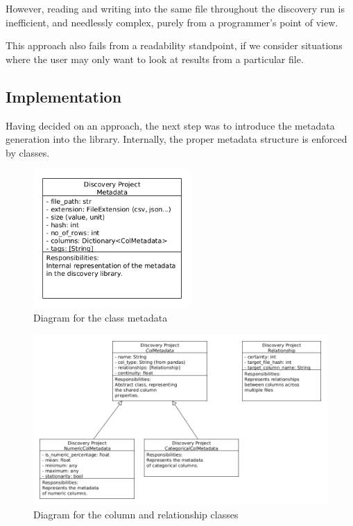However, reading and writing into the same file throughout the discovery run is inefficient, and
needlessly complex, purely from a programmer's point of view.

This approach also fails from a readability standpoint, if we consider situations where the user
may only want to look at results from a particular file.

\subsection{Implementation}

Having decided on an approach, the next step was to introduce the metadata generation into the library.
Internally, the proper metadata structure is enforced by classes.

\begin{figure}[h]
    \centering
    \includegraphics[width=6cm]{figures/metadata/metadata_class}
    \caption{Diagram for the class metadata}
    \label{fig:metadata_fig_1}
\end{figure}



\begin{figure}[h]
    \centering
    \includegraphics[width=12cm]{figures/metadata/col_rel_class}
    \caption{Diagram for the column and relationship classes}
    \label{fig:metadata_fig_2}
\end{figure}

